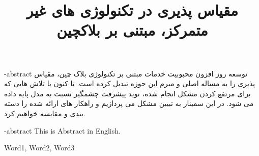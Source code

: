 \documentclass[oneside,openany,mscS]{SBU-Thesis}
\newcommand\blankpage{%
    \null
    \thispagestyle{empty}%
    \addtocounter{page}{-1}%
    \newpage}
\begin{document}
	\title{مقیاس پذیری در تکنولوژی های غیر متمرکز، مبتنی بر بلاکچین}
	
	\subject{مهندسی کامپیوتر}
	
	
	
	
	


	
	
	
	\fa-abstract{
توسعه روز افزون محبوبیت خدمات مبتنی بر تکنولوژی بلاک چین، مقیاس پذیری را به مساله اصلی و مبرم این حوزه تبدیل کرده است. تا کنون با تلاش هایی که برای مرتفع کردن مشکل انجام شده، نوید پیشرفت چشمگیر نسبت به مدل پایه داده می شود. در این سمینار به تبیین مشکل می پردازیم و راهکار های ارائه شده را دسته بندی و مقایسه خواهیم کرد. 
	}
	
	
\firstPage %
\afterpage{\blankpage}
\pagebreak

\tableofcontents %
\listoffigures \newpage %
\listoftables \newpage %

	
\abstractPage %
		




	

\newpage


\en-abstract
{
	This is Abstract in English.
}

\latinkeywords
{
	Word1, Word2, Word3
}

\latinAbstractPage %
\latinFirstPage %

	
\end{document}
